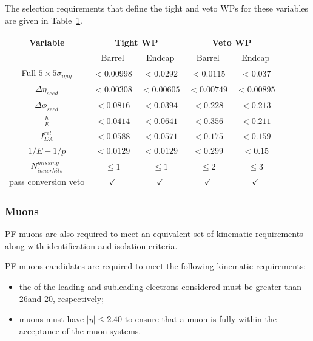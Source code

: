 The selection requirements that define the tight and veto WPs for these variables are given in Table~\ref{tab:electronCuts}.

\begin{table}[htbp]
\label{tab:electronCuts}
  \centering
 \begin{tabular}{ccccc}
   \hline
   \textbf{Variable} & \multicolumn{2}{c}{\textbf{Tight WP}} & \multicolumn{2}{c}{\textbf{Veto WP}}   \\
    & Barrel & Endcap & Barrel & Endcap \\
    \hline   
    Full $5\times5 \sigma_{i\eta i\eta}$ & $< 0.00998$ & $< 0.0292$ & $< 0.0115$ & $< 0.037$ \\
    $\Delta \eta_{seed}$ & $<0.00308$ & $<0.00605$ & $<0.00749$ & $<0.00895$ \\
    $\Delta \phi_{seed}$ & $<0.0816$ & $<0.0394$ & $<0.228$ & $<0.213$ \\
    $\frac{h}{E}$ & $<0.0414$ & $<0.0641$ & $<0.356$ & $<0.211$	\\
    $I^{rel}_{EA}$ & $<0.0588$ & $<0.0571$ & $<0.175$ & $<0.159$ \\
    $1/E - 1/p$ & $<0.0129$ & $<0.0129$ & $<0.299$ & $<0.15$ \\
    $N^{missing}_{inner hits}$ & $\leq 1$ & $\leq 1$ & $\leq 2$ & $\leq 3$ \\
    pass conversion veto & $\checkmark$ & $\checkmark$ & $\checkmark$ & $\checkmark$ \\
    \hline
 \end{tabular}%
\end{table}

\subsubsection{Muons}\label{subsubsec:muonSelection}
PF muons are also required to meet an equivalent set of kinematic requirements along with identification and isolation criteria.

PF muons candidates are required to meet the following kinematic requirements:
\begin{itemize}
\item the \pt of the leading and subleading electrons considered must be greater than 26\GeVc and 20\GeVc, respectively;
\item muons must have $|\eta| \leq 2.40$ to ensure that a muon is fully within the acceptance of the muon systems.
\end{itemize}

